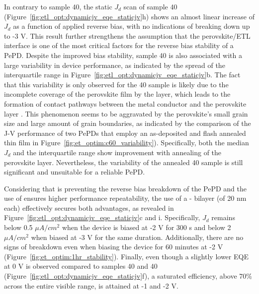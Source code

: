 In contrary to sample 40, the static $J_d$ scan of sample 40 (Figure~\ref{fig:etl_opt:dynamicjv_eqe_staticjv}h) shows an almost linear increase of $J_d$ as a function of applied reverse bias, with no indications of breaking down up to -3 V. This result further strengthens the assumption that the perovskite/ETL interface is one of the most critical factors for the reverse bias stability of a PePD. Despite the improved bias stability, sample 40 is also associated with a large variability in device performance, as indicated by the spread of the interquartile range in Figure~\ref{fig:etl_opt:dynamicjv_eqe_staticjv}b. The fact that this variability is only observed for the 40 sample is likely due to the incomplete coverage of the perovskite film by the  layer, which leads to the formation of contact pathways between the metal conductor and the perovskite layer \cite{Lin2015LowImaging, Younes2021EnhancingLayer}. This phenomenon seems to be aggravated by the perovskite's small grain size and large amount of grain boundaries, as indicated by the comparison of the J-V performance of two PePDs that employ an as-deposited and flash annealed  thin film in Figure~\ref{fig:et_optim:c60_variability}). Specifically, both the median $J_d$ and the interquartile range show improvement with annealing of the perovskite layer. Nevertheless, the variability of the annealed 40 sample is still significant and unsuitable for a reliable PePD. 




Considering that  is preventing the reverse bias breakdown of the PePD and the use of  ensures higher performance repeatability, the use of a - bilayer (of 20 nm each) effectively secures both advantages, as revealed in Figure~\ref{fig:etl_opt:dynamicjv_eqe_staticjv}c and i. Specifically, $J_d$ remains below 0.5 $\mu A/cm^2$ when the device is biased at -2 V for 300 s and below 2 $\mu A/cm^2$ when biased at -3 V for the same duration. Additionally, there are no signs of breakdown even when biasing the device for 60 minutes at -2 V (Figure~\ref{fig:et_optim:1hr_stability}). Finally, even though a slightly lower EQE at 0 V is observed compared to samples 40 and 40 (Figure~\ref{fig:etl_opt:dynamicjv_eqe_staticjv}f), a saturated efficiency, above 70\% across the entire visible range, is attained at -1 and -2 V. 


